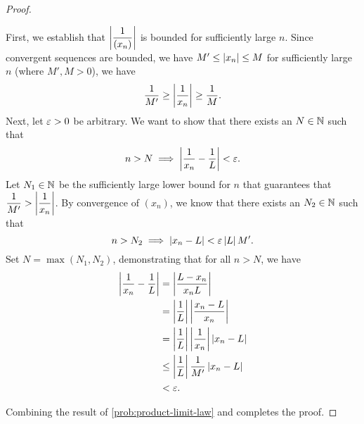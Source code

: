 \begin{problem}
\begin{enumerate}[label=(\alph*)]
\begin{proof}
        \begin{subproof}
          First, we establish that $\left\lvert \dfrac{1}{(x_{n})} \right\rvert$ is bounded for
          sufficiently large $n$. Since convergent\footnotemark{} sequences are
          bounded, we have $M' \leq \left\lvert x_{n} \right\rvert \leq M$ for sufficiently large $n$
          (where $M', M > 0$), we have 
          \[
            \dfrac{1}{M'} \geq \left\lvert \dfrac{1}{x_{n}} \right\rvert \geq \dfrac{1}{M}.
          \]
          Next, let $\varepsilon > 0$ be arbitrary. We want to show that there exists
          an $N \in \mathbb{N}$ such that
          \begin{align*}
            n > N \implies \left\lvert \frac{1}{x_{n}} - \frac{1}{L} \right\rvert < \varepsilon.
          \end{align*}
          Let $N_{1} \in \mathbb{N}$ be the sufficiently large lower bound for $n$ that guarantees that
          $\dfrac{1}{M'} > \left\lvert \dfrac{1}{x_{n}} \right\rvert$. By convergence of
          $(x_{n})$, we know that there exists an $N_{2} \in \mathbb{N}$ such that
          \[
            n > N_{2} \implies \left\lvert x_{n} - L \right\rvert < \varepsilon \left\lvert L \right\rvert M'.
          \]
          Set $N = \max(N_{1}, N_{2})$, demonstrating that for all $n > N$, we have
          \begin{align*}
            \left\lvert \dfrac{1}{x_{n}} - \dfrac{1}{L} \right\rvert &= \left\lvert \dfrac{L - x_{n}}{x_{n}L} \right\rvert \\
                                                  &= \left\lvert \dfrac{1}{L} \right\rvert \left\lvert \dfrac{x_{n} - L}{x_{n}} \right\rvert \\
                                                  &= \left\lvert \dfrac{1}{L} \right\rvert \left\lvert \dfrac{1}{x_{n}} \right\rvert \left\lvert x_{n} - L \right\rvert \\
                                                  &\leq \left\lvert \dfrac{1}{L} \right\rvert \dfrac{1}{M'} \left\lvert x_{n} - L \right\rvert \\
                                                  &< \varepsilon.
          \end{align*}
        \end{subproof}

        Combining the result of \ref{prob:product-limit-law} and
         completes the proof.
      \end{proof}

  \end{enumerate}
\end{problem}

